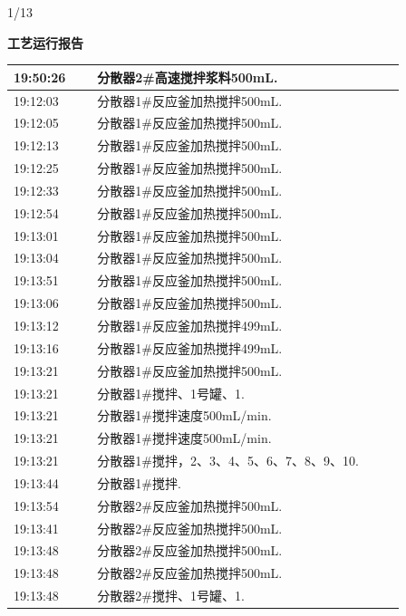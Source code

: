 \documentclass[UTF8,10pt,a4paper,fontset=fandol]{ctexart}
\newcommand{\handwritten}[1]{#1}
\begin{document}
\vfill

\handwritten{1/13}

\newpage

\begin{center}
\begin{minipage}[t]{0.47\linewidth}
\centering
\textbf{工艺运行报告}

\vspace{2mm}
\scriptsize
\begin{tabular}{|p{0.19\linewidth}|p{0.70\linewidth}|}
\hline
19:50:26 & 分散器2#高速搅拌浆料500mL. \\ \hline
19:12:03 & 分散器1#反应釜加热搅拌500mL. \\ \hline
19:12:05 & 分散器1#反应釜加热搅拌500mL. \\ \hline
19:12:13 & 分散器1#反应釜加热搅拌500mL. \\ \hline
19:12:25 & 分散器1#反应釜加热搅拌500mL. \\ \hline
19:12:33 & 分散器1#反应釜加热搅拌500mL. \\ \hline
19:12:54 & 分散器1#反应釜加热搅拌500mL. \\ \hline
19:13:01 & 分散器1#反应釜加热搅拌500mL. \\ \hline
19:13:04 & 分散器1#反应釜加热搅拌500mL. \\ \hline
19:13:51 & 分散器1#反应釜加热搅拌500mL. \\ \hline
19:13:06 & 分散器1#反应釜加热搅拌500mL. \\ \hline
19:13:12 & 分散器1#反应釜加热搅拌499mL. \\ \hline
19:13:16 & 分散器1#反应釜加热搅拌499mL. \\ \hline
19:13:21 & 分散器1#反应釜加热搅拌500mL. \\ \hline
19:13:21 & 分散器1#搅拌、1号罐、1. \\ \hline
19:13:21 & 分散器1#搅拌速度500mL/min. \\ \hline
19:13:21 & 分散器1#搅拌速度500mL/min. \\ \hline
19:13:21 & 分散器1#搅拌，2、3、4、5、6、7、8、9、10. \\ \hline
19:13:44 & 分散器1#搅拌. \\ \hline
19:13:54 & 分散器2#反应釜加热搅拌500mL. \\ \hline
19:13:41 & 分散器2#反应釜加热搅拌500mL. \\ \hline
19:13:48 & 分散器2#反应釜加热搅拌500mL. \\ \hline
19:13:48 & 分散器2#反应釜加热搅拌500mL. \\ \hline
19:13:48 & 分散器2#搅拌、1号罐、1. \\ \hline
\end{tabular}


\end{minipage}
\end{center}
\end{document}
